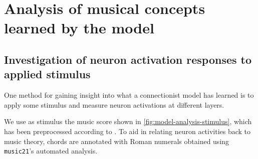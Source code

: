 \chapter{Analysis of musical concepts learned by the model}
\ifpdf
    \graphicspath{{Chapter5/Figs/Raster/}{Chapter5/Figs/PDF/}{Chapter5/Figs/}}
\else
    \graphicspath{{Chapter5/Figs/Vector/}{Chapter5/Figs/}}
\fi

\section{Investigation of neuron activation responses to applied stimulus}

One method for gaining insight into what a connectionist model has learned is
to apply some stimulus and measure neuron activations at different layers.

We use as stimulus the music score shown in
\cref{fig:model-analysis-stimulus}, which has been preprocessed according to
. To aid in relating neuron activities back to music
theory, chords are annotated with Roman numerals obtained using {\tt music21}'s
automated analysis.

